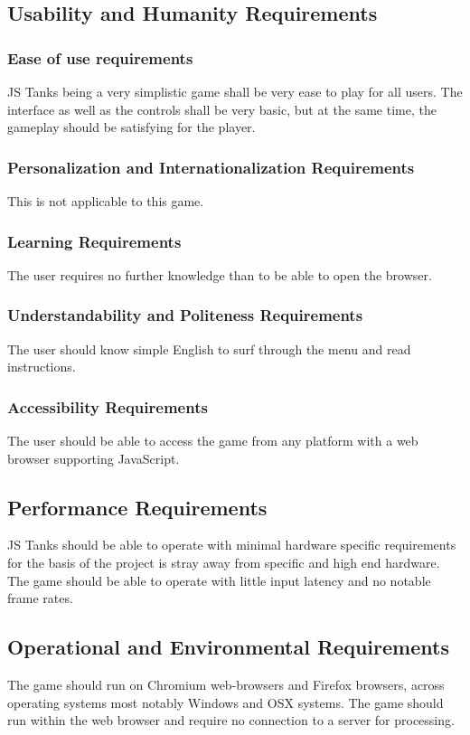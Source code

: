 \documentclass[12pt, titlepage]{article}
\begin{document}
\subsection{Usability and Humanity Requirements}
\subsubsection{Ease of use requirements}
JS Tanks being a very simplistic game shall be very ease to play for all users. 
The interface as well as the controls shall be very basic, but at the same time, 
the gameplay should be satisfying for the player.
\subsubsection{Personalization and Internationalization Requirements}
This is not applicable to this game.
\subsubsection{Learning Requirements}
The user requires no further knowledge than to be able to open the browser.
\subsubsection{Understandability and Politeness Requirements}
The user should know simple English to surf through the menu and read 
instructions.
\subsubsection{Accessibility Requirements}
The user should be able to access the game from any platform with a web browser 
supporting JavaScript.
\subsection{Performance Requirements}
JS Tanks should be able to operate with minimal hardware specific requirements 
for the basis of the project is stray away from specific and high end hardware. 
The game should be able to operate with little input latency and no notable 
frame rates.
\subsection{Operational and Environmental Requirements}
The game should run on Chromium web-browsers and Firefox browsers, across 
operating systems most notably Windows and OSX systems. The game should run 
within the web browser and require no connection to a server for processing.
\end{document}
